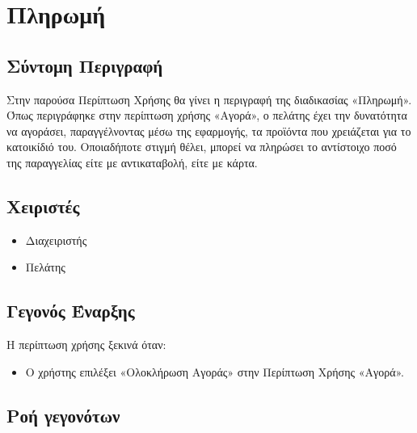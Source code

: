 \documentclass[12pt,a4paper,twoside]{book}
\begin{document}
\section{Πληρωμή} %

\subsection{Σύντομη Περιγραφή}
Στην παρούσα Περίπτωση Χρήσης θα γίνει η περιγραφή της διαδικασίας «Πληρωμή». Όπως περιγράφηκε στην περίπτωση χρήσης «Αγορά», ο πελάτης έχει την δυνατότητα να αγοράσει, παραγγέλνοντας μέσω της εφαρμογής, τα προϊόντα που χρειάζεται για το κατοικίδιό του. Οποιαδήποτε στιγμή θέλει, μπορεί να πληρώσει το αντίστοιχο ποσό της παραγγελίας είτε με αντικαταβολή, είτε με κάρτα. %

\subsection{Χειριστές}
\begin{itemize}
  \item Διαχειριστής
  \item Πελάτης
\end{itemize}

\subsection{Γεγονός Έναρξης}
Η περίπτωση χρήσης ξεκινά όταν:
\begin{itemize}
  \item Ο χρήστης επιλέξει «Ολοκλήρωση Αγοράς» στην Περίπτωση Χρήσης «Αγορά». %
\end{itemize}

\subsection{Ροή γεγονότων}
\end{document}
